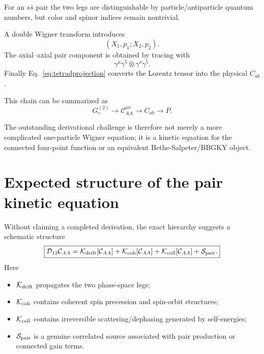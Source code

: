 \documentclass[11pt]{article}
\newcommand{\Ccal}{\mathcal C}
\newcommand{\Dcal}{\mathcal D}
\newcommand{\Scal}{\mathcal S}
\newcommand{\Kcal}{\mathcal K}
\begin{document}
For an $s\bar s$ pair the two legs are distinguishable by particle/antiparticle quantum numbers, but color and spinor indices remain nontrivial.

A double Wigner transform introduces
\begin{equation}
(X_1,p_1;X_2,p_2).
\end{equation}
The axial--axial pair component is obtained by tracing with
\begin{equation}
\gamma^\mu\gamma^5\otimes\gamma^\nu\gamma^5.
\end{equation}
Finally Eq.~\eqref{eq:tetradprojection} converts the Lorentz tensor into the physical $C_{ab}$.

This chain can be summarized as
\begin{equation}
\boxed{
G_c^{(2)}
\longrightarrow
\Ccal^{\mu\nu}_{AA}
\longrightarrow
C_{ab}
\longrightarrow
P.
}
\label{eq:chain4point}
\end{equation}

The outstanding derivational challenge is therefore not merely a more complicated one-particle Wigner equation; it is a kinetic equation for the connected four-point function or an equivalent Bethe-Salpeter/BBGKY object.

\section{Expected structure of the pair kinetic equation}

Without claiming a completed derivation, the exact hierarchy suggests a schematic structure
\begin{equation}
\boxed{
\Dcal_{12}\Ccal_{AA}
=
\Kcal_{\rm drift}[\Ccal_{AA}]
+\Kcal_{\rm coh}[\Ccal_{AA}]
+\Kcal_{\rm coll}[\Ccal_{AA}]
+\Scal_{\rm pair}.
}
\label{eq:schematicpair}
\end{equation}
Here

\begin{itemize}[leftmargin=1.5em]
\item $\Kcal_{\rm drift}$ propagates the two phase-space legs;
\item $\Kcal_{\rm coh}$ contains coherent spin precession and spin-orbit structures;
\item $\Kcal_{\rm coll}$ contains irreversible scattering/dephasing generated by self-energies;
\item $\Scal_{\rm pair}$ is a genuine correlated source associated with pair production or connected gain terms.
\end{itemize}
\end{document}
